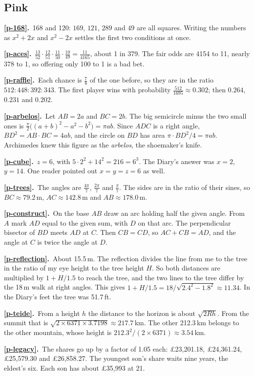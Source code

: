 \documentclass[11pt,a4paper]{article}
\newcounter{prob}
\newcommand{\ans}[2]{\par\smallskip\noindent\textbf{\ref{#1}.}\ #2}
\begin{document}
\subsection*{\color{bandpink}Pink}
\ans{p-168}{168 and 120: $169$, $121$, $289$ and $49$ are all squares. Writing the numbers
as $x^2+2x$ and $x^2-2x$ settles the first two conditions at once.}
\ans{p-aces}{$\tfrac{13}{52}\cdot\tfrac{12}{51}\cdot\tfrac{11}{50}\cdot\tfrac{10}{49} =
\tfrac{11}{4165}$, about 1 in 379. The fair odds are 4154 to 11, nearly 378 to 1, so
offering only 100 to 1 is a bad bet.}
\ans{p-raffle}{Each chance is $\tfrac78$ of the one before, so they are in the ratio
$512 : 448 : 392 : 343$. The first player wins with probability $\tfrac{512}{1695}\approx
0.302$; then $0.264$, $0.231$ and $0.202$.}
\ans{p-arbelos}{Let $AB = 2a$ and $BC = 2b$. The big semicircle minus the two small ones
is $\tfrac\pi2\bigl((a+b)^2 - a^2 - b^2\bigr) = \pi ab$. Since $ADC$ is a right angle,
$BD^2 = AB\cdot BC = 4ab$, and the circle on $BD$ has area $\pi\cdot BD^2/4 = \pi ab$.
Archimedes knew this figure as the \textit{arbelos}, the shoemaker's knife.}
\ans{p-cube}{$z = 6$, with $5\cdot 2^2 + 14^2 = 216 = 6^3$. The Diary's answer was
$x=2$, $y=14$. One reader pointed out $x = y = z = 6$ as well.}
\ans{p-trees}{The angles are $\tfrac{4\pi}7$, $\tfrac{2\pi}7$ and $\tfrac{\pi}7$. The sides
are in the ratio of their sines, so $BC \approx 79.2$\,m, $AC\approx142.8$\,m and
$AB\approx178.0$\,m.}
\ans{p-construct}{On the base $AB$ draw an arc holding half the given angle. From $A$ mark
$AD$ equal to the given sum, with $D$ on that arc. The perpendicular bisector of $BD$ meets
$AD$ at $C$. Then $CB = CD$, so $AC + CB = AD$, and the angle at $C$ is twice the angle at
$D$.}
\ans{p-reflection}{About 15.5\,m. The reflection divides the line from me to the tree in
the ratio of my eye height to the tree height $H$. So both distances are multiplied by
$1 + H/1.5$ to reach the tree, and the two lines to the tree differ by the 18\,m walk
at right angles. This gives $1 + H/1.5 = 18/\sqrt{2.4^2 - 1.8^2} \approx 11.34$. In the
Diary's feet the tree was 51.7\,ft.}
\ans{p-teide}{From a height $h$ the distance to the horizon is about $\sqrt{2Rh}$. From
the summit that is $\sqrt{2\times 6371\times 3.7198}\approx217.7$\,km. The other
212.3\,km belongs to the other mountain, whose height is $212.3^2/(2\times6371)\approx
3.54$\,km.}
\ans{p-legacy}{The shares go up by a factor of 1.05 each: \pounds23{,}201.18,
\pounds24{,}361.24, \pounds25{,}579.30 and \pounds26{,}858.27. The youngest son's share
waits nine years, the eldest's six. Each son has about \pounds35{,}993 at 21.}
\end{document}
